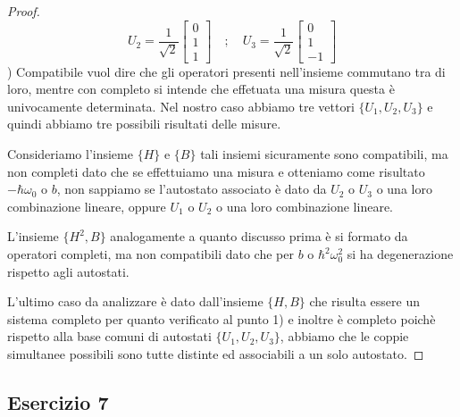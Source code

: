 \begin{proof}
	\begin{equation*}
		U_2 = \frac{1}{\sqrt{2}}\left [ \begin{array}{c}
			0 \\ 1 \\ 1
		\end{array}\right] \quad ; \quad U_3 = \frac{1}{\sqrt{2}} \left [ \begin{array}{c}
			0 \\ 1 \\ -1
		\end{array}\right] 
	\end{equation*}
) Compatibile vuol dire che gli operatori presenti nell'insieme commutano tra di loro, mentre con completo si intende che effetuata una misura questa \`e univocamente determinata. Nel nostro caso abbiamo tre vettori $\{U_1,U_2,U_3\}$ e quindi abbiamo tre possibili risultati delle misure.

Consideriamo l'insieme $\{H \}$ e $\{B\}$ tali insiemi sicuramente sono compatibili, ma non completi dato che se effettuiamo una misura e otteniamo come risultato $-\hbar\omega_0$ o $b$, non sappiamo se l'autostato associato \`e dato da $U_2$ o $U_3$ o una loro combinazione lineare, oppure $U_1$ o $U_2$ o una loro combinazione lineare.

L'insieme $\{H^2 ,B \}$ analogamente a quanto discusso prima \`e si formato da operatori completi, ma non compatibili dato che per $b$ o $\hbar^2 \omega_0^2$ si ha degenerazione rispetto agli autostati.

L'ultimo caso da analizzare \`e dato dall'insieme $\{H,B\}$ che risulta essere un sistema completo per quanto verificato al punto 1) e inoltre  \`e completo poich\`e rispetto alla base comuni di autostati $\{U_1,U_2,U_3\}$, abbiamo che le coppie simultanee possibili sono tutte distinte ed associabili a un solo autostato.

\end{proof}

\subsection{Esercizio 7}

